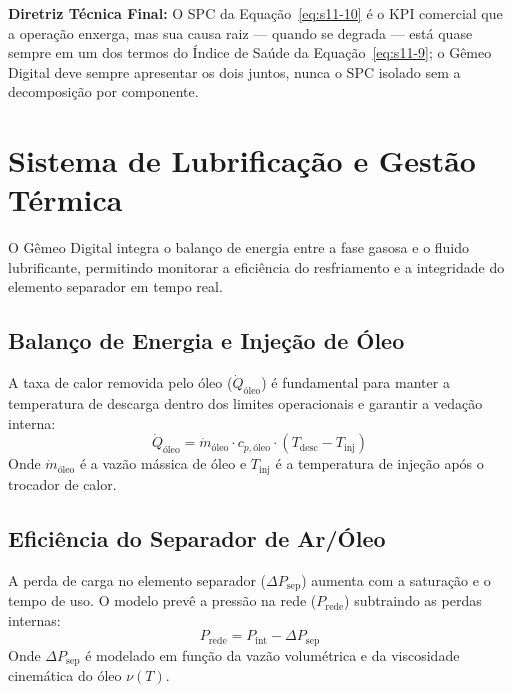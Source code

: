 \documentclass[12pt,a4paper]{article}
\numberwithin{equation}{section}
\numberwithin{table}{section}
\numberwithin{figure}{section}
\begin{document}
	\textbf{Diretriz Técnica Final:} O SPC da Equação~\eqref{eq:s11-10} é o KPI comercial que a operação enxerga, mas sua causa raiz — quando se degrada — está quase sempre em um dos termos do Índice de Saúde da Equação~\eqref{eq:s11-9}; o Gêmeo Digital deve sempre apresentar os dois juntos, nunca o SPC isolado sem a decomposição por componente.

	
	
	\section{\textbf{Sistema de Lubrificação e Gestão Térmica}}
	
	O Gêmeo Digital integra o balanço de energia entre a fase gasosa e o fluido lubrificante, permitindo monitorar a eficiência do resfriamento e a integridade do elemento separador em tempo real.
	
	\subsection{\textbf{Balanço de Energia e Injeção de Óleo}}
	A taxa de calor removida pelo óleo ($\dot{Q}_{\text{óleo}}$) é fundamental para manter a temperatura de descarga dentro dos limites operacionais e garantir a vedação interna:
	\begin{equation}\label{eq:s12-1}
 \dot{Q}_{\text{óleo}} = \dot{m}_{\text{óleo}} \cdotp c_{p,\text{óleo}} \cdotp (T_{\text{desc}} - T_{\text{inj}}) 
\end{equation}
	Onde $\dot{m}_{\text{óleo}}$ é a vazão mássica de óleo e $T_{\text{inj}}$ é a temperatura de injeção após o trocador de calor.
	
	\subsection{\textbf{Eficiência do Separador de Ar/Óleo}}
	A perda de carga no elemento separador ($\Delta P_{\text{sep}}$) aumenta com a saturação e o tempo de uso. O modelo prevê a pressão na rede ($P_{\text{rede}}$) subtraindo as perdas internas:
	\begin{equation}\label{eq:s12-2}
 P_{\text{rede}} = P_{\text{int}} - \Delta P_{\text{sep}} 
\end{equation}
	Onde $\Delta P_{\text{sep}}$ é modelado em função da vazão volumétrica e da viscosidade cinemática do óleo $\nu(T)$.
	
\end{document}
